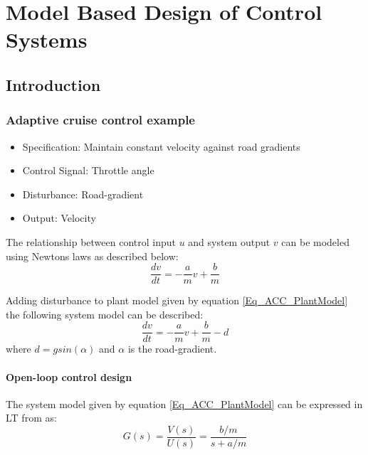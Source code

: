 \part{Model Based Design of Control Systems}

\chapter{Introduction}

\section{Adaptive cruise control example}

\begin{itemize}
	\item Specification: Maintain constant velocity against road gradients
	\item Control Signal: Throttle angle
	\item Disturbance: Road-gradient
	\item Output: Velocity
\end{itemize}

The relationship between control input $u$ and system output $v$ can be modeled using Newtons laws as described below:
\begin{equation}\label{Eq_ACC_PlantModel}
	\frac{dv}{dt} = -\frac{a}{m}v + \frac{b}{m}
\end{equation}

Adding disturbance to plant model given by equation \eqref{Eq_ACC_PlantModel} the following system model can be described:
\begin{equation} \label{Eq_ACC_PlantModel_with_d}
	\frac{dv}{dt} = -\frac{a}{m}v + \frac{b}{m} -d
\end{equation}
where $d = g sin(\alpha)$ and $\alpha$ is the road-gradient.

\subsection{Open-loop control design}

The system model given by equation \eqref{Eq_ACC_PlantModel} can be expressed in LT from as:
\begin{equation}
	G(s) = \frac{V(s)}{U(s)} = \frac{b/m}{s + a/m}
\end{equation}

